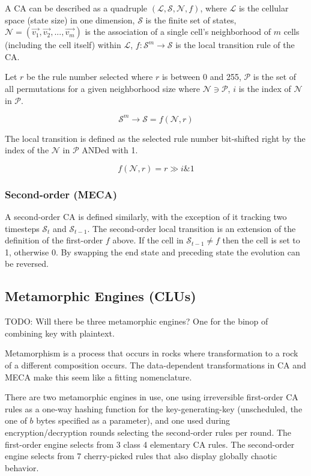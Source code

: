 \documentclass{article}
\begin{document}
A CA can be described as a quadruple $(\mathcal{L},\mathcal{S},\mathcal{N},f)$, where $\mathcal{L}$ is the cellular space (state size) in one dimension, $\mathcal{S}$ is the finite set of states, $\mathcal{N} = (\vec{v_1}, \vec{v_2}, ..., \vec{v_m})$ is the association of a single cell's neighborhood of $m$ cells (including the cell itself) within $\mathcal{L}$, $f: \mathcal{S}^{m}\rightarrow\mathcal{S}$ is the local transition rule of the CA.

Let $r$ be the rule number selected where $r$ is between 0 and 255, $\mathcal{P}$ is the set of all permutations for a given neighborhood size where $\mathcal{N} \ni \mathcal{P}$, $i$ is the index of $\mathcal{N}$ in $\mathcal{P}$.

$$
  \mathcal{S}^{m}\rightarrow\mathcal{S} = f(\mathcal{N}, r)
$$

The local transition is defined as the selected rule number bit-shifted right by the index of the $\mathcal{N}$ in $\mathcal{P}$ ANDed with 1.

$$
  f(\mathcal{N}, r) = r \gg i \mathbin{\&} 1
$$

\subsubsection{Second-order (MECA)}

A second-order CA is defined similarly, with the exception of it tracking two timesteps $\mathcal{S}_t$ and $\mathcal{S}_{t-1}$. The second-order local transition is an extension of the definition of the first-order $f$ above. If the cell in $\mathcal{S}_{t-1} \ne f$ then the cell is set to 1, otherwise 0. By swapping the end state and preceding state the evolution can be reversed.

\subsection{Metamorphic Engines (CLUs)}

TODO: Will there be three metamorphic engines? One for the binop of combining key with plaintext.

Metamorphism is a process that occurs in rocks where transformation to a rock of a different composition occurs. The data-dependent transformations in CA and MECA make this seem like a fitting nomenclature.

There are two metamorphic engines in use, one using irreversible first-order CA rules as a one-way hashing function for the key-generating-key (unscheduled, the one of $b$ bytes specified as a parameter), and one used during encryption/decryption rounds selecting the second-order rules per round. The first-order engine selects from 3 class 4 elementary CA rules. The second-order engine selects from 7 cherry-picked rules that also display globally chaotic behavior\cite{MECA-Properties}.
\end{document}
